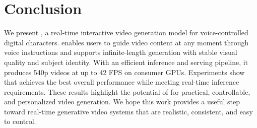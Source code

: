 \section{Conclusion}
We present \ours, a real-time interactive video generation model for voice-controlled digital characters. \ours enables users to guide video content at any moment through voice instructions and supports infinite-length generation with stable visual quality and subject identity. With an efficient inference and serving pipeline, it produces 540p videos at up to 42 FPS on consumer GPUs. Experiments show that \ours achieves the best overall performance while meeting real-time inference requirements. These results highlight the potential of \ours for practical, controllable, and personalized video generation. We hope this work provides a useful step toward real-time generative video systems that are realistic, consistent, and easy to control.